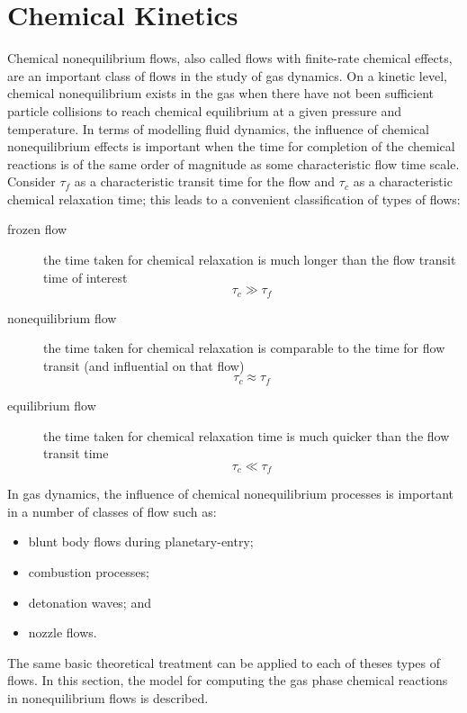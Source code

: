 \chapter{Chemical Kinetics}
\label{chap:chem-kinetics}

Chemical nonequilibrium flows, also called flows with finite-rate chemical effects,
are an important class of flows in the study of gas dynamics.
On a kinetic level, chemical nonequilibrium exists in the gas when there have not been 
sufficient particle collisions to reach chemical equilibrium
at a given pressure and temperature.
In terms of modelling fluid dynamics, the influence of chemical nonequilibrium
effects is important when the time for completion of the chemical reactions
is of the same order of magnitude as some characteristic flow time scale.
Consider
$\tau_f$ as a characteristic transit time for the flow and $\tau_c$ as a characteristic chemical relaxation time; this leads to a convenient classification of types of flows:
\begin{description}
  \item[frozen flow] the time taken for chemical relaxation is much longer
                     than the flow transit time of interest
                     \[ \tau_c \gg \tau_f \]
  \item[nonequilibrium flow] the time taken for chemical relaxation is comparable
                             to the time for flow transit (and influential on that flow)
                             \[ \tau_c \approx \tau_f \]
  \item[equilibrium flow] the time taken for chemical relaxation time is much quicker
                          than the flow transit time
                          \[ \tau_c \ll \tau_f \]
\end{description}

In gas dynamics, the influence of chemical nonequilibrium processes
is important in a number of classes of flow such as:
\begin{itemize}
\item blunt body flows during planetary-entry;
\item combustion processes;
\item detonation waves; and
\item nozzle flows.
\end{itemize}
The same basic theoretical treatment
can be applied to each of theses types of flows.
In this section, the model for computing 
the gas phase chemical reactions in nonequilibrium flows is described.


